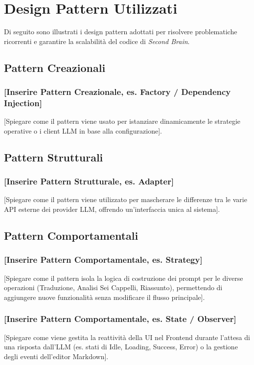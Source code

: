 \section{Design Pattern Utilizzati}
Di seguito sono illustrati i design pattern adottati per risolvere problematiche ricorrenti e garantire la scalabilità del codice di \textit{Second Brain}.

\subsection{Pattern Creazionali}

\subsubsection{[Inserire Pattern Creazionale, es. Factory / Dependency Injection]}
[Spiegare come il pattern viene usato per istanziare dinamicamente le strategie operative o i client LLM in base alla configurazione].

\subsection{Pattern Strutturali}

\subsubsection{[Inserire Pattern Strutturale, es. Adapter]}
[Spiegare come il pattern viene utilizzato per mascherare le differenze tra le varie API esterne dei provider LLM, offrendo un'interfaccia unica al sistema].

\subsection{Pattern Comportamentali}

\subsubsection{[Inserire Pattern Comportamentale, es. Strategy]}
[Spiegare come il pattern isola la logica di costruzione dei prompt per le diverse operazioni (Traduzione, Analisi Sei Cappelli, Riassunto), permettendo di aggiungere nuove funzionalità senza modificare il flusso principale].

\subsubsection{[Inserire Pattern Comportamentale, es. State / Observer]}
[Spiegare come viene gestita la reattività della UI nel Frontend durante l'attesa di una risposta dall'LLM (es. stati di Idle, Loading, Success, Error) o la gestione degli eventi dell'editor Markdown].